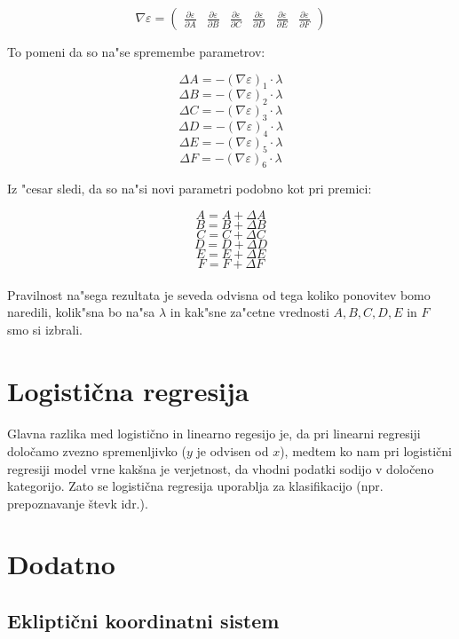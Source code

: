 \documentclass[a4paper, 12pt]{article}
\begin{document}
	$$\nabla \varepsilon = \begin{pmatrix}
	\frac{\partial \varepsilon}{\partial A} &
	\frac{\partial \varepsilon}{\partial B} &
	\frac{\partial \varepsilon}{\partial C} &
	\frac{\partial \varepsilon}{\partial D} &
	\frac{\partial \varepsilon}{\partial E} &
	\frac{\partial \varepsilon}{\partial F}
	\end{pmatrix}$$
	
	To pomeni da so na"se spremembe parametrov:
	
	$$\Delta A = -(\nabla \varepsilon)_1 \cdot \lambda$$
	$$\Delta B = -(\nabla \varepsilon)_2 \cdot \lambda$$
	$$\Delta C = -(\nabla \varepsilon)_3 \cdot \lambda$$
	$$\Delta D = -(\nabla \varepsilon)_4 \cdot \lambda$$
	$$\Delta E = -(\nabla \varepsilon)_5 \cdot \lambda$$
	$$\Delta F = -(\nabla \varepsilon)_6 \cdot \lambda$$
	
	Iz "cesar sledi, da so na"si novi parametri podobno kot pri premici:
	
	$$A = A + \Delta A$$
	$$B = B + \Delta B$$
	$$C = C + \Delta C$$
	$$D = D + \Delta D$$
	$$E = E + \Delta E$$
	$$F = F + \Delta F$$
	
	\paragraph{}Pravilnost na"sega rezultata je seveda odvisna od tega koliko ponovitev bomo naredili, kolik"sna bo na"sa $\lambda$ in kak"sne za"cetne vrednosti $A, B, C, D, E$ in $F$ smo si izbrali.
	
	\section*{Logistična regresija}
	\paragraph{}
	Glavna razlika med logistično in linearno regesijo je, da pri linearni regresiji določamo zvezno spremenljivko ($y$ je odvisen od $x$), medtem ko nam pri logistični regresiji model vrne kakšna je verjetnost, da vhodni podatki sodijo v določeno kategorijo.
	Zato se logistična regresija uporablja za klasifikacijo (npr. prepoznavanje števk idr.).
	
	
	\section*{Dodatno}
	\subsection*{Ekliptični koordinatni sistem}
\end{document}
